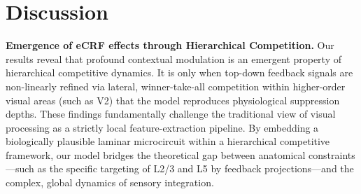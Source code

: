 \section{Discussion}
\label{sec:discussion}

\label{sec:disc_emergence}

\textbf{Emergence of eCRF effects through Hierarchical Competition.} Our results reveal that profound contextual modulation is an emergent property of hierarchical competitive dynamics. It is only when top-down feedback signals are non-linearly refined via lateral, winner-take-all competition within higher-order visual areas (such as V2) that the model reproduces physiological suppression depths. These findings fundamentally challenge the traditional view of visual processing as a strictly local feature-extraction pipeline. By embedding a biologically plausible laminar microcircuit within a hierarchical competitive framework, our model bridges the theoretical gap between anatomical constraints---such as the specific targeting of L2/3 and L5 by feedback projections---and the complex, global dynamics of sensory integration.

